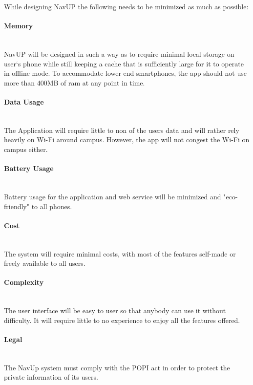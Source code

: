 While designing NavUP the following needs to be minimized as much as possible:


\paragraph{Memory}
\mbox{}\\
NavUP will be designed in such a way as to require minimal local storage on user`s phone while still keeping a cache that is sufficiently large for it to operate in offline mode. To accommodate lower end smartphones, the app should not use more than 400MB of ram at any point in time.

\paragraph{Data Usage}
\mbox{}\\
The Application will require little to non of the users data and will rather rely heavily on Wi-Fi around campus. However, the app will not congest the Wi-Fi on campus either.

\paragraph{Battery Usage}
\mbox{}\\
Battery usage for the application and web service will be minimized and "eco-friendly" to all phones.

\paragraph{Cost}
\mbox{}\\
The system will require minimal costs, with most of the features self-made or freely available to all users.

\paragraph{Complexity}
\mbox{}\\
The user interface will be easy to user so that anybody can use it without difficulty. 
It will require little to no experience to enjoy all the features offered.

\paragraph{Legal}
\mbox{}\\
The NavUp system must comply with the POPI act in order to protect the private information of its users.
